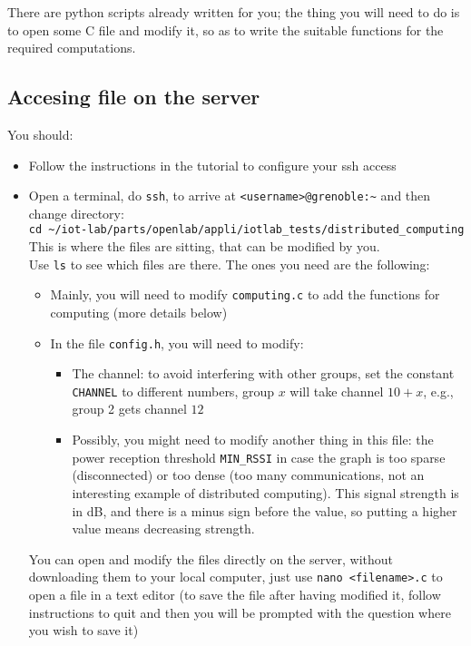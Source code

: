 \documentclass{article}
\begin{document}

There are python scripts already written for you; the thing you will need to do
is to open some C file and modify it, so as to write the suitable functions for
the required computations.

\subsection{Accesing file on the server}

You should:
\begin{itemize}
\item Follow the instructions in the tutorial to configure your ssh access
\item Open a  terminal, do \verb=ssh=, to arrive at \verb=<username>@grenoble:~= and then change directory:\\
\verb=cd ~/iot-lab/parts/openlab/appli/iotlab_tests/distributed_computing= \\
This is where the files are sitting, that can be modified by you.\\

Use \verb=ls= to see which files are there. The ones you need are the following:
	\begin{itemize}
	\item Mainly, you will need to modify \verb=computing.c= to add the functions for computing (more details below)
	\item In the file \verb=config.h=, you will need to modify:
		\begin{itemize}

		\item The channel: to avoid interfering with other groups, set the
            constant \verb=CHANNEL= to different numbers, group $x$ will take
            channel $10+x$, e.g., group 2 gets channel $12$
		\item Possibly, you might  need to modify another thing in this file:
            the power reception threshold \verb=MIN_RSSI= in case the graph is
            too sparse (disconnected) or too dense (too many communications, not
            an interesting example of distributed computing). This signal
            strength is in dB, and there is a minus sign before the value,
            so putting a higher value means decreasing strength.
		\end{itemize}
	\end{itemize}
You can open and modify the files directly on the server, without downloading
them to your local computer, just use \verb=nano <filename>.c= to open a file in
a text editor (to save the file after having modified it, follow instructions to
quit and then you will be prompted with the question where you wish to save it)


\end{itemize}
\end{document}
